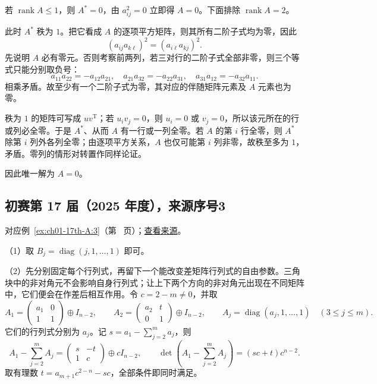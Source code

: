 \documentclass[12pt,fontset=fandol]{ctexart}
\begin{document}
\begin{solve}

若 $\operatorname{rank}A\leq1$，则 $A^*=0$，由 $a_{ij}^2=0$ 立即得 $A=0$。下面排除 $\operatorname{rank}A=2$。

此时 $A^*$ 秩为 $1$。把它看成 $A$ 的逐项平方矩阵，则其所有二阶子式均为零，因此
\[
(a_{ij}a_{k\ell})^2=(a_{i\ell}a_{kj})^2.
\]
先说明 $A$ 必有零元。否则考察前两列，若三对行的二阶子式全部非零，则三个等式只能分别取负号：
\[
a_{11}a_{22}=-a_{12}a_{21},\quad
 a_{21}a_{32}=-a_{22}a_{31},\quad
 a_{31}a_{12}=-a_{32}a_{11}.
\]
相乘矛盾。故至少有一个二阶子式为零，其对应的伴随矩阵元素及 $A$ 元素也为零。

秩为 $1$ 的矩阵可写成 $uv^{\mathrm T}$；若 $u_i v_j=0$，则 $u_i=0$ 或 $v_j=0$，所以该元所在的行或列必全零。于是 $A^*$、从而 $A$ 有一行或一列全零。若 $A$ 的第 $i$ 行全零，则 $A^*$ 除第 $i$ 列外各列全零；由逐项平方关系，$A$ 也仅可能第 $i$ 列非零，故秩至多为 $1$，矛盾。零列的情形对转置作同样论证。

因此唯一解为 $A=0$。

\end{solve}

\subsection{初赛第 17 届（2025 年度），来源序号3}\label{ans:ch01-17th-A:3}\label{pr:ch01-17th-A:3}

对应例~\ref{ex:ch01-17th-A:3}（第~\pageref{ex:ch01-17th-A:3} 页）；\href{https://github.com/lzxcr/cmc-mathematics/blob/64916fa1fdbc3e444a652eca204d5669058ee321/src/problems/preliminary/17/03.md}{查看来源}。

\begin{solve}

（1）取 $B_j=\operatorname{diag}(j,1,\ldots,1)$ 即可。

（2）先分别固定每个行列式，再留下一个能改变差矩阵行列式的自由参数。三角块中的非对角元不会影响自身行列式；让上下两个方向的非对角元出现在不同矩阵中，它们便会在作差后相互作用。令 $c=2-m\neq0$，并取
\[
A_1=\begin{pmatrix}a_1&0\\1&1\end{pmatrix}\oplus I_{n-2},
\qquad
A_2=\begin{pmatrix}a_2&t\\0&1\end{pmatrix}\oplus I_{n-2},
\qquad
A_j=\operatorname{diag}(a_j,1,\ldots,1)\quad(3\leq j\leq m).
\]
它们的行列式分别为 $a_j$。记 $s=a_1-\sum_{j=2}^m a_j$，则
\[
A_1-\sum_{j=2}^mA_j
=\begin{pmatrix}s&-t\\1&c\end{pmatrix}\oplus cI_{n-2},
\qquad
\det\left(A_1-\sum_{j=2}^mA_j\right)=(sc+t)c^{n-2}.
\]
取有理数 $t=a_{m+1}c^{2-n}-sc$，全部条件即同时满足。

\end{solve}
\end{document}
